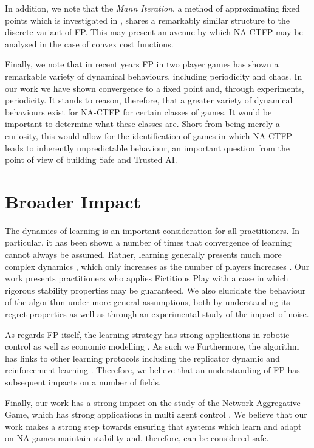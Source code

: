 \documentclass{article}
\theoremstyle{definition}
\begin{document}
	In addition, we note that the \emph{Mann Iteration}, a method of approximating fixed points which is investigated in \cite{Parise2020}, shares a remarkably similar structure to the discrete variant of FP. This may present an avenue by which NA-CTFP may be analysed in the case of convex cost functions. 
	
	Finally, we note that in recent years FP in two player games has shown a remarkable variety of dynamical behaviours, including periodicity and chaos. In our work we have shown convergence to a fixed point and, through experiments, periodicity. It stands to reason, therefore, that a greater variety of dynamical behaviours exist for NA-CTFP for certain classes of games. It would be important to determine what these classes are. Short from being merely a curiosity, this would allow for the identification of games in which NA-CTFP leads to inherently unpredictable behaviour, an important question from the point of view of building Safe and Trusted AI.

\section*{Broader Impact}

The dynamics of learning is an important consideration for all practitioners. In particular, it has
been shown a number of times \cite{noneqmbehaviour} that convergence of learning cannot always be
assumed. Rather, learning generally presents much more complex dynamics \cite{gallaandfarmer}, which
only increases as the number of players increases \cite{sanders}. Our work presents practitioners
who applies Fictitious Play with a case in which rigorous stability properties may be guaranteed.
We also elucidate the behaviour of the algorithm under more general assumptions, both by
understanding its regret properties as well as through an experimental study of the impact of noise.

As regards FP  itself, the learning strategy has strong applications in robotic control
\cite{Smyrnakis, Hernandez, Sharma} as well as economic modelling \cite{vonNeumann}. As such we
Furthermore, the algorithm has links to other learning protocols including the replicator dynamic
\cite{Benaim} and reinforcement learning \cite{LeslieandCollins}. Therefore, we believe that an
understanding of FP has subsequent impacts on a number of fields.

Finally, our work has a strong impact on the study of the Network Aggregative Game, which has strong
applications in multi agent control \cite{GrammaticoAggregativeControl}. We 
believe that our work makes a strong step towards ensuring that systems which learn and adapt on
NA games maintain stability and, therefore, can be considered safe.
\end{document}

